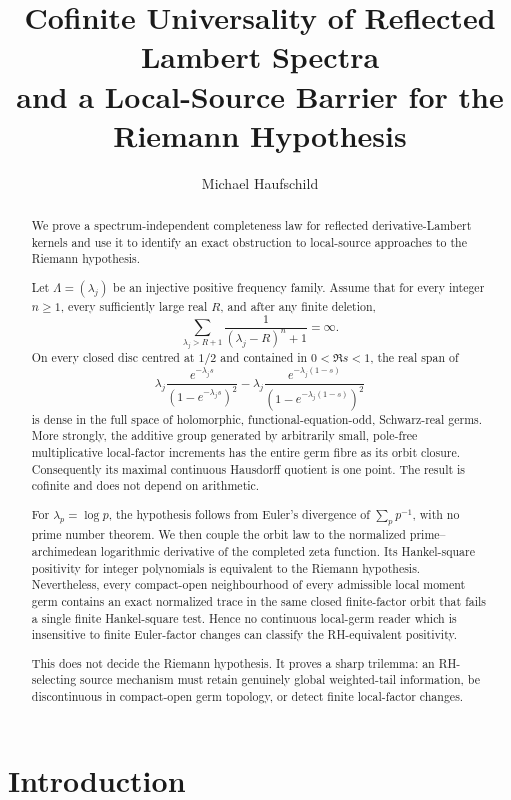 \documentclass[11pt]{article}
\title{Cofinite Universality of Reflected Lambert Spectra\\
and a Local-Source Barrier for the Riemann Hypothesis}
\author{Michael Haufschild}
\date{}
\begin{document}
\maketitle

\begin{abstract}
We prove a spectrum-independent completeness law for reflected derivative-Lambert
kernels and use it to identify an exact obstruction to local-source approaches to the
Riemann hypothesis.

Let \(\Lambda=(\lambda_j)\) be an injective positive frequency family.  Assume that for
every integer \(n\geq1\), every sufficiently large real \(R\), and after any finite
deletion,
\[
 \sum_{\lambda_j>R+1}\frac{1}{(\lambda_j-R)^n+1}=\infty.
\]
On every closed disc centred at \(1/2\) and contained in \(0<\Re s<1\), the real span of
\[
 \lambda_j\frac{e^{-\lambda_j s}}{(1-e^{-\lambda_j s})^2}
 -
 \lambda_j\frac{e^{-\lambda_j(1-s)}}{(1-e^{-\lambda_j(1-s)})^2}
\]
is dense in the full space of holomorphic, functional-equation-odd,
Schwarz-real germs.  More strongly, the additive group generated by arbitrarily
small, pole-free multiplicative local-factor increments has the entire germ fibre as
its orbit closure.  Consequently its maximal continuous Hausdorff quotient is one
point.  The result is cofinite and does not depend on arithmetic.

For \(\lambda_p=\log p\), the hypothesis follows from Euler's divergence of
\(\sum_p p^{-1}\), with no prime number theorem.  We then couple the orbit law to the
normalized prime--archimedean logarithmic derivative of the completed zeta function.
Its Hankel-square positivity for integer polynomials is equivalent to the Riemann
hypothesis.  Nevertheless, every compact-open neighbourhood of every admissible local
moment germ contains an exact normalized trace in the same closed finite-factor orbit
that fails a single finite Hankel-square test.  Hence no continuous local-germ reader
which is insensitive to finite Euler-factor changes can classify the RH-equivalent
positivity.

This does not decide the Riemann hypothesis.  It proves a sharp trilemma: an
RH-selecting source mechanism must retain genuinely global weighted-tail information,
be discontinuous in compact-open germ topology, or detect finite local-factor changes.
\end{abstract}

\section{Introduction}
\end{document}

